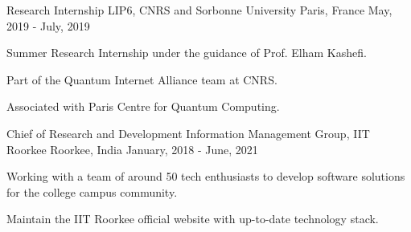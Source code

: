 \begin{cventries}
  \cventry
    {Research Internship} %
    {LIP6, CNRS and Sorbonne University} %
    {Paris, France} %
    {May, 2019 - July, 2019} %
    {
      \begin{cvitems} %
        \item {Summer Research Internship under the guidance of Prof. Elham Kashefi.}
        \item {Part of the Quantum Internet Alliance team at CNRS.}
        \item {Associated with Paris Centre for Quantum Computing.}
      \end{cvitems}
    }

  \cventry
    {Chief of Research and Development} %
    {Information Management Group, IIT Roorkee} %
    {Roorkee, India} %
    {January, 2018 - June, 2021} %
    {
      \begin{cvitems} %
        \item {Working with a team of around 50 tech enthusiasts to develop software solutions for the college campus community.}
        \item {Maintain the IIT Roorkee official website with up-to-date technology stack.}
      \end{cvitems}
    }

\end{cventries}
